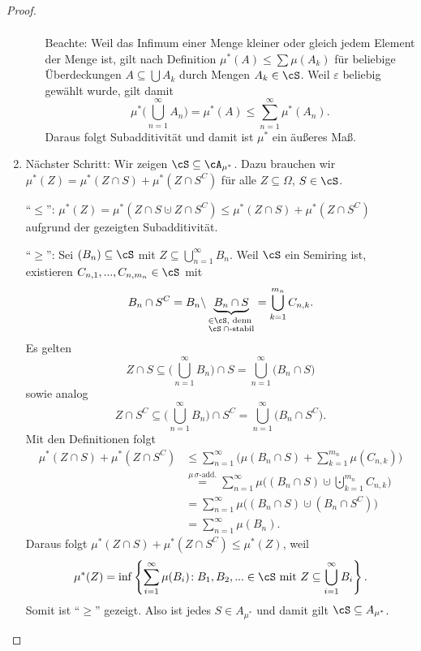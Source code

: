 \begin{proof}
\begin{enumerate}[label=(\alph*)]
\begin{itemize}
\begin{gather*}
		\end{gather*}
		Beachte: Weil das Infimum einer Menge kleiner oder gleich jedem Element der Menge ist, gilt nach Definition $\mu^*(A)\leq \sum \mu(A_k)$ f\"ur beliebige \"Uberdeckungen $A\subseteq \bigcup A_k$ durch Mengen $A_k\in \cS$. Weil $\varepsilon$ beliebig gew\"ahlt wurde, gilt damit \[ \mu^{*} \Big(\bigcup\limits_{n = 1}^{\infty} A_n\Big) = \mu^{*}(A) \leq \sum\limits_{n = 1}^{\infty} \mu^{*}(A_n). \]
		Daraus folgt Subadditivität und damit ist $\mu^{*}$ ein äußeres Maß.		
	\end{itemize}
	\item 	
		Nächster Schritt: Wir zeigen $\cS \subseteq \cA_{\mu^{*}}$. Dazu brauchen wir $\mu^{*}(Z) = \mu^{*}(Z \cap S) + \mu^{*}(Z \cap S^C)$ für alle $Z \subseteq \Omega$, $S \in \cS$.
		
		\enquote{$\leq$}: $\mu^{*}(Z) = \mu^{*}(Z \cap S \cupdot Z \cap S^C) \leq \mu^{*}(Z \cap S) + \mu^{*}(Z \cap S^C)$ aufgrund der gezeigten Subadditivit\"at.
		
		\enquote{$\geq$}: Sei $(B_n) \subseteq \cS$ mit $Z \subseteq \bigcup\limits_{n = 1}^{\infty} B_n.$ Weil $\cS$ ein Semiring ist, existieren $C_{n,1},..., C_{n,m_n} \in \cS$ mit \[ B_n \cap S^C = B_n \backslash \underbrace{B_n \cap S}_{\substack{\in \cS \text{, denn }\\ \cS \: \cap \text{-stabil}}} = \bigcup\limits_{k = 1}^{m_n} C_{n,k}. \]
		Es gelten 
			 \[ Z \cap S \subseteq \Big(\bigcup\limits_{n = 1}^{\infty} B_n\Big) \cap S = \bigcup\limits_{n = 1}^{\infty} \big( B_n \cap S \big) \]
			 sowie analog
			 \[ Z \cap S^C \subseteq  \Big(\bigcup\limits_{n = 1}^{\infty} B_n\Big) \cap S^C= \bigcup\limits_{n = 1}^{\infty} \big( B_n \cap S^C \big). \]
		Mit den Definitionen folgt
		\begin{align*}
			\mu^{*} (Z \cap S) + \mu^{*} (Z \cap S^C) 
			&\leq \sum\limits_{n=1}^{\infty} \Big(\mu( B_n \cap S) +\sum\limits_{k=1}^{m_n} \mu(C_{n,k})\Big )\\
			&\overset{\mu\,\sigma\text{-add.}}{=} \sum\limits_{n=1}^{\infty} \mu \Big((B_n \cap S) \cupdot \bigcupdot\limits_{k=1}^{m_n} C_{n,k} \Big)\\
			& = \sum\limits_{n=1}^{\infty} \mu \big((B_n \cap S )\cupdot( B_n \cap S^C)\big)\\
			&=\sum_{n=1}^\infty \mu(B_n).
		\end{align*}
		Daraus folgt $\mu^{*}(Z \cap S) + \mu^{*}(Z \cap S^C) \leq \mu^{*}(Z)$, weil \[\mu^{*}(Z) = \inf\left\{ \sum\limits_{i=1}^{\infty} \mu(B_i) \! : B_1,B_2,... \in \cS \text{ mit } Z \subseteq \bigcup\limits_{i = 1}^{\infty} B_i \right\}.\] Somit ist \enquote{$\geq$} gezeigt.		
		Also ist jedes $S \in A_{\mu^{*}}$ und damit gilt $\cS \subseteq A_{\mu^{*}}$.
		

\end{enumerate}
\end{proof}
